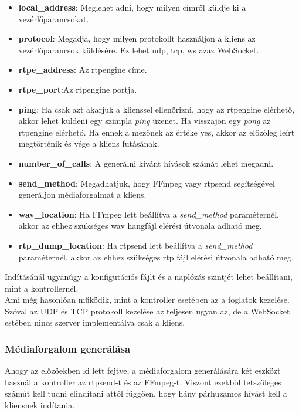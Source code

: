 \begin{itemize}
	\item \textbf{local\_address}: Meglehet adni, hogy milyen címről küldje
	ki a vezérlőparancsokat.
	\item \textbf{protocol}: Megadja, hogy milyen protokollt használjon a kliens az
	vezérlőparancsok küldésére. Ez lehet udp, tcp, ws azaz WebSocket.
	\item \textbf{rtpe\_address}: Az rtpengine címe. 
	\item \textbf{rtpe\_port}:Az rtpengine portja.
	\item \textbf{ping}: Ha csak azt akarjuk a klienssel ellenőrizni, hogy az rtpengine
	elérhető, akkor lehet küldeni egy szimpla \textit{ping} üzenet. Ha visszajön egy
	\textit{pong} az rtpengine elérhető. Ha ennek a mezőnek az értéke yes, akkor 
	az előzőleg leírt megtörténik és vége a kliens futásának. 
	\item \textbf{number\_of\_calls}: A generálni kívánt hívások számát lehet megadni. 
	\item \textbf{send\_method}: Megadhatjuk, hogy FFmpeg vagy rtpsend segítségével
	generáljon médiaforgalmat a kliens.
	\item \textbf{wav\_location}: Ha FFmpeg lett beállítva a \textit{send\_method} 
	paraméternél, akkor az ehhez szükséges wav hangfájl elérési útvonala adható meg.
	\item \textbf{rtp\_dump\_location}: Ha rtpsend lett beállítva a 
	\textit{send\_method} paraméternél, akkor az ehhez szükséges rtp fájl elérési 
	útvonala adható meg.
\end{itemize}

Indításánál ugyanúgy a konfigutációs fájlt és a naplózás szintjét lehet beállítani,
mint a kontrollernél. \\

Ami még hasonlóan működik, mint a kontroller esetében az a foglatok kezelése.
Szóval az UDP és TCP protokoll kezelése az teljesen ugyan az, de a WebSocket estében
nincs szerver implementálva csak a kliens. 

\subsubsection{Médiaforgalom generálása}

Ahogy az előzőekben ki lett fejtve, a médiaforgalom generálására két eszközt 
használ a kontroller az rtpsend-t és az FFmpeg-t. Viszont ezekből tetszőleges
számút kell tudni elindítani attól függően, hogy hány párhuzamos hívást kell 
a kliensnek indítania.

